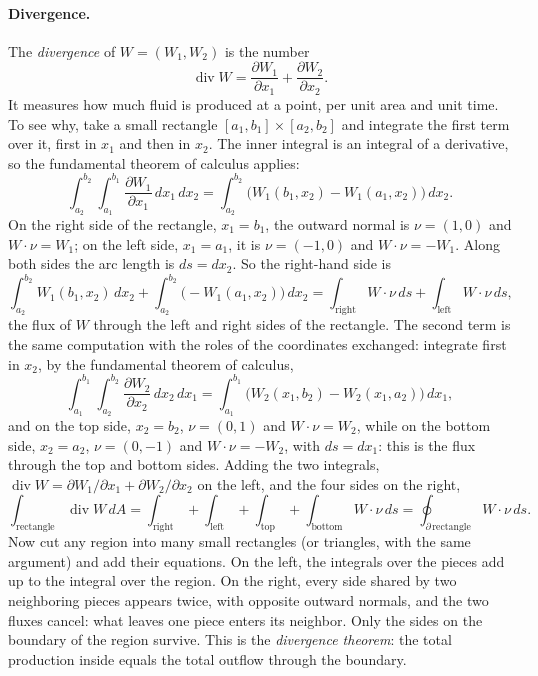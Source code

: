 \paragraph{Divergence.} The \emph{divergence} of $W = (W_1, W_2)$ is the number
\begin{equation*}
\operatorname{div} W = \frac{\partial W_1}{\partial x_1} + \frac{\partial W_2}{\partial x_2} .
\end{equation*}
It measures how much fluid is produced at a point, per unit area and unit time. To see why, take a small rectangle $[a_1, b_1] \times [a_2, b_2]$ and integrate the first term over it, first in $x_1$ and then in $x_2$. The inner integral is an integral of a derivative, so the fundamental theorem of calculus applies:
\begin{equation*}
\int_{a_2}^{b_2} \int_{a_1}^{b_1} \frac{\partial W_1}{\partial x_1}\, dx_1\, dx_2 = \int_{a_2}^{b_2} \big( W_1(b_1, x_2) - W_1(a_1, x_2) \big)\, dx_2 .
\end{equation*}
On the right side of the rectangle, $x_1 = b_1$, the outward normal is $\nu = (1, 0)$ and $W\cdot\nu = W_1$; on the left side, $x_1 = a_1$, it is $\nu = (-1, 0)$ and $W\cdot\nu = -W_1$. Along both sides the arc length is $ds = dx_2$. So the right-hand side is
\begin{equation*}
\int_{a_2}^{b_2} W_1(b_1, x_2)\, dx_2 + \int_{a_2}^{b_2} \big(-W_1(a_1, x_2)\big)\, dx_2 = \int_{\text{right}} W\cdot\nu\, ds + \int_{\text{left}} W\cdot\nu\, ds ,
\end{equation*}
the flux of $W$ through the left and right sides of the rectangle. The second term is the same computation with the roles of the coordinates exchanged: integrate first in $x_2$, by the fundamental theorem of calculus,
\begin{equation*}
\int_{a_1}^{b_1} \int_{a_2}^{b_2} \frac{\partial W_2}{\partial x_2}\, dx_2\, dx_1 = \int_{a_1}^{b_1} \big( W_2(x_1, b_2) - W_2(x_1, a_2) \big)\, dx_1 ,
\end{equation*}
and on the top side, $x_2 = b_2$, $\nu = (0, 1)$ and $W\cdot\nu = W_2$, while on the bottom side, $x_2 = a_2$, $\nu = (0, -1)$ and $W\cdot\nu = -W_2$, with $ds = dx_1$: this is the flux through the top and bottom sides. Adding the two integrals, $\operatorname{div} W = \partial W_1/\partial x_1 + \partial W_2/\partial x_2$ on the left, and the four sides on the right,
\begin{equation*}
\int_{\text{rectangle}} \operatorname{div} W\, dA = \int_{\text{right}} + \int_{\text{left}} + \int_{\text{top}} + \int_{\text{bottom}} W\cdot\nu\, ds = \oint_{\partial\, \text{rectangle}} W\cdot\nu\, ds .
\end{equation*}
Now cut any region into many small rectangles (or triangles, with the same argument) and add their equations. On the left, the integrals over the pieces add up to the integral over the region. On the right, every side shared by two neighboring pieces appears twice, with opposite outward normals, and the two fluxes cancel: what leaves one piece enters its neighbor. Only the sides on the boundary of the region survive. This is the \emph{divergence theorem}: the total production inside equals the total outflow through the boundary.

